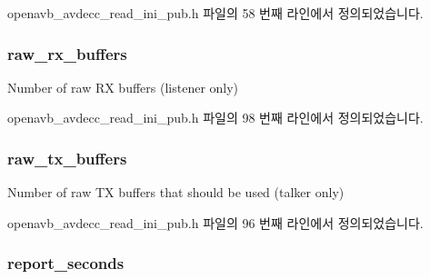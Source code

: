 openavb\+\_\+avdecc\+\_\+read\+\_\+ini\+\_\+pub.\+h 파일의 58 번째 라인에서 정의되었습니다.

\subsubsection[{\texorpdfstring{raw\+\_\+rx\+\_\+buffers}{raw_rx_buffers}}]{ raw\+\_\+rx\+\_\+buffers}\hypertarget{structopenavb__tl__data__cfg_a878cfe34b25df40f0858bff76cbfd4e6}{}\label{structopenavb__tl__data__cfg_a878cfe34b25df40f0858bff76cbfd4e6}


Number of raw RX buffers (listener only) 



openavb\+\_\+avdecc\+\_\+read\+\_\+ini\+\_\+pub.\+h 파일의 98 번째 라인에서 정의되었습니다.

\subsubsection[{\texorpdfstring{raw\+\_\+tx\+\_\+buffers}{raw_tx_buffers}}]{ raw\+\_\+tx\+\_\+buffers}\hypertarget{structopenavb__tl__data__cfg_add91cb46547dd8e10a83b4807314b515}{}\label{structopenavb__tl__data__cfg_add91cb46547dd8e10a83b4807314b515}


Number of raw TX buffers that should be used (talker only) 



openavb\+\_\+avdecc\+\_\+read\+\_\+ini\+\_\+pub.\+h 파일의 96 번째 라인에서 정의되었습니다.

\subsubsection[{\texorpdfstring{report\+\_\+seconds}{report_seconds}}]{ report\+\_\+seconds}\hypertarget{structopenavb__tl__data__cfg_aa421113dd03391cac7220cd7dd7ee59b}{}\label{structopenavb__tl__data__cfg_aa421113dd03391cac7220cd7dd7ee59b}


